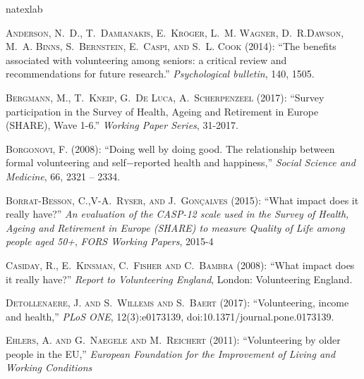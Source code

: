 \documentclass[10pt, letterpaper]{article}
\begin{document}
\begin{spacing}{1.4}
\begin{thebibliography}{87}
\newcommand{\enquote}[1]{``#1''}
\expandafter\ifx\csname natexlab\endcsname\relax\def\natexlab#1{#1}\fi

\textsc{Anderson, N.~D., T.~Damianakis, E.~Kr{\"o}ger, L.~M. Wagner, D.~R.Dawson, M.~A. Binns, S.~Bernstein, E.~Caspi, and S.~L. Cook} (2014):  \enquote{The benefits associated with volunteering among seniors: a critical  review and recommendations for future research.} \emph{Psychological bulletin}, 140, 1505.

\textsc{Bergmann, M., T.~Kneip, G.~De Luca, A.~Scherpenzeel} (2017):  \enquote{Survey participation in the Survey of Health, Ageing and Retirement in Europe (SHARE), Wave 1-6.} \emph{Working Paper Series}, 31-2017.


\textsc{Borgonovi, F.} (2008): \enquote{Doing well by doing good. The relationship between formal volunteering and self$-$reported health and happiness,} \emph{Social Science and Medicine}, 66,  2321 -- 2334.

\textsc{Borrat-Besson, C.,V-A.~Ryser, and J.~Gonçalves} (2015):  \enquote{What impact does it really have?} \emph{An evaluation of the CASP-12 scale used in the Survey of Health, Ageing and Retirement in Europe (SHARE) to measure Quality of Life among people aged 50+}, \emph{FORS Working Papers}, 2015-4


\textsc{Casiday, R., E.~Kinsman, C.~Fisher and C.~Bambra} (2008):  \enquote{What impact does it really have?} \emph{Report to Volunteering England}, London: Volunteering England.

\textsc{Detollenaere, J. and S.~Willems and S.~Baert} (2017): \enquote{Volunteering, income and health,} \emph{PLoS ONE}, 12(3):e0173139,  doi:10.1371/journal.pone.0173139.

\textsc{Ehlers, A. and G.~Naegele and M.~Reichert} (2011): \enquote{Volunteering by older people in the EU,} \emph{European Foundation for the Improvement of Living and Working Conditions} 


\end{thebibliography}
\end{spacing}
\end{document}
